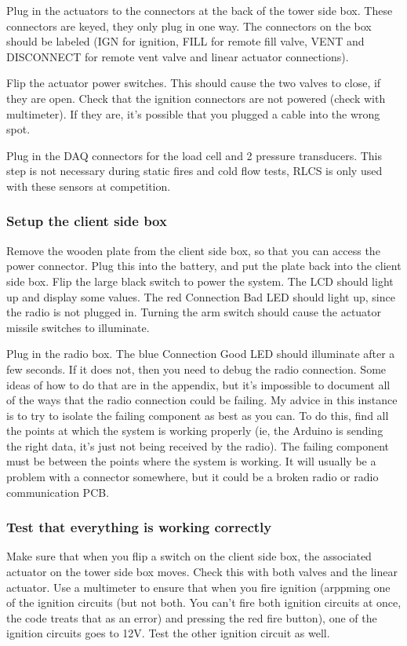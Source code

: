 \documentclass[11pt]{article}
\begin{document}
Plug in the actuators to the connectors at the back of the tower side box. These
connectors are keyed, they only plug in one way. The connectors on the box
should be labeled (IGN for ignition, FILL for remote fill valve, VENT and
DISCONNECT for remote vent valve and linear actuator connections).

Flip the actuator power switches. This should cause the two valves to close, if
they are open. Check that the ignition connectors are not powered (check with
multimeter). If they are, it's possible that you plugged a cable into the wrong
spot.

Plug in the DAQ connectors for the load cell and 2 pressure transducers. This
step is not necessary during static fires and cold flow tests, RLCS is only used
with these sensors at competition.

\subsubsection{Setup the client side box}
\label{sec:orgea0a775}

Remove the wooden plate from the client side box, so that you can access the
power connector. Plug this into the battery, and put the plate back into the
client side box. Flip the large black switch to power the system. The LCD should
light up and display some values. The red Connection Bad LED should light up,
since the radio is not plugged in. Turning the arm switch should cause the
actuator missile switches to illuminate.

Plug in the radio box. The blue Connection Good LED should illuminate after a
few seconds. If it does not, then you need to debug the radio connection. Some
ideas of how to do that are in the appendix, but it's impossible to document all
of the ways that the radio connection could be failing. My advice in this
instance is to try to isolate the failing component as best as you can. To do
this, find all the points at which the system is working properly (ie, the
Arduino is sending the right data, it's just not being received by the
radio). The failing component must be between the points where the system is
working. It will usually be a problem with a connector somewhere, but it could
be a broken radio or radio communication PCB.

\subsubsection{Test that everything is working correctly}
\label{sec:org5fd4be5}
Make sure that when you flip a switch on the client side box, the associated
actuator on the tower side box moves. Check this with both valves and the linear
actuator. Use a multimeter to ensure that when you fire ignition (arppming one of
the ignition circuits (but not both. You can't fire both ignition circuits at
once, the code treats that as an error) and pressing the red fire button), one
of the ignition circuits goes to 12V. Test the other ignition circuit as well.
\end{document}
